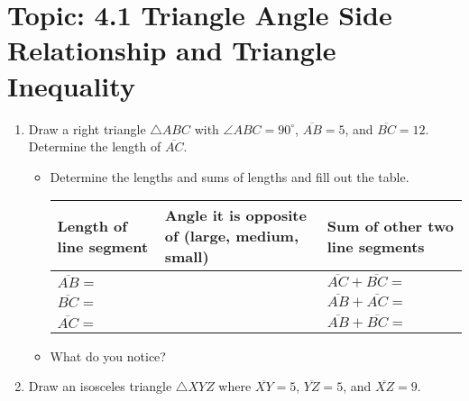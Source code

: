 \documentclass[12pt,letterpaper]{article}
\begin{document}
\newpage
\section*{Topic: 4.1 Triangle Angle Side Relationship and Triangle Inequality}
\begin{enumerate}
    \item Draw a right triangle $\triangle ABC$ with $\angle ABC = 90^{\circ}$, $\overline{AB} = 5$, and $\overline{BC} = 12$.
          \\ Determine the length of $\overline{AC}$.
          \begin{itemize}
              \item Determine the lengths and sums of lengths and fill out the table. \\

                    \begin{tabularx}{0.9\textwidth} {
                            | >{\flushleft\arraybackslash}X
                            | >{\flushleft\arraybackslash}X
                            | >{\flushleft\arraybackslash}X |}
                        \hline
                        Length of line segment \vspace{1mm}       & Angle it is opposite of (large, medium, small) & Sum of other two line segments    \\
                        \hline
                        $\overline{AB}=$ \vspace{1mm}             &                                                & $\overline{AC} + \overline{BC}= $ \\
                        \hline
                        \vspace{1mm}$\overline{BC}=$ \vspace{1mm} &                                                & $\overline{AB} + \overline{AC}= $ \\
                        \hline
                        $\overline{AC}=$ \vspace{1mm}             &                                                & $\overline{AB} + \overline{BC}= $ \\
                        \hline
                    \end{tabularx}
              \item What do you notice?
          \end{itemize}
    \item Draw an isosceles triangle $\triangle XYZ$ where $\overline{XY} = 5$, $\overline{YZ} = 5$, and $\overline{XZ} = 9$.


\end{enumerate}
\end{document}

